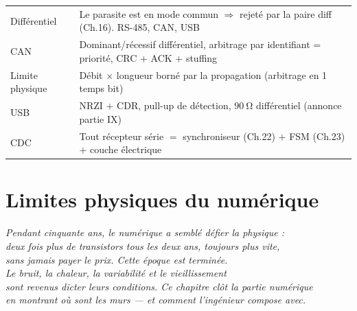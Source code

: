 \documentclass[12pt,a4paper,twoside]{book}
\begin{document}
\begin{ingenieur}[title={\color{white} Résumé --- Niveau Ingénieur}]
\begin{center}
\renewcommand{\arraystretch}{1.3}
\begin{tabular}{p{3.5cm}p{9.5cm}}
\toprule
Différentiel & Le parasite est en mode commun $\Rightarrow$ rejeté par la paire diff (Ch.16). RS-485, CAN, USB \\
CAN & Dominant/récessif différentiel, arbitrage par identifiant = priorité, CRC + ACK + stuffing \\
Limite physique & Débit $\times$ longueur borné par la propagation (arbitrage en 1 temps bit) \\
USB & NRZI + CDR, pull-up de détection, $\SI{90}{\ohm}$ différentiel (annonce partie IX) \\
CDC & Tout récepteur série $=$ synchroniseur (Ch.22) $+$ FSM (Ch.23) $+$ couche électrique \\
\bottomrule
\end{tabular}
\end{center}
\end{ingenieur}



\chapter{Limites physiques du numérique}

\begin{center}
\textit{Pendant cinquante ans, le numérique a semblé défier la physique :\\
deux fois plus de transistors tous les deux ans, toujours plus vite,\\
sans jamais payer le prix. Cette époque est terminée.\\
Le bruit, la chaleur, la variabilité et le vieillissement\\
sont revenus dicter leurs conditions. Ce chapitre clôt la partie numérique\\
en montrant où sont les murs --- et comment l'ingénieur compose avec.}
\end{center}

\vspace{0.5cm}
\end{document}
